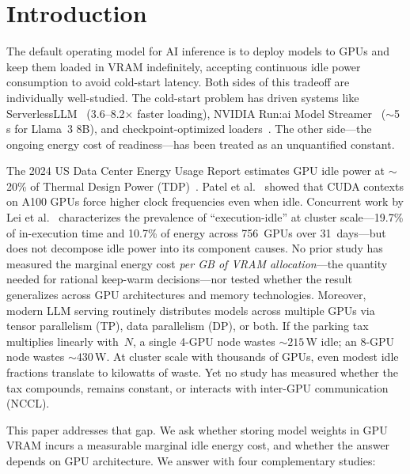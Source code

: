 \documentclass[sigconf,nonacm]{acmart}
\begin{document}
\section{Introduction}

The default operating model for AI inference is to deploy models to GPUs and keep them loaded in VRAM indefinitely, accepting continuous idle power consumption to avoid cold-start latency. Both sides of this tradeoff are individually well-studied. The cold-start problem has driven systems like ServerlessLLM~\cite{serverlessllm} (3.6--8.2$\times$ faster loading), NVIDIA Run:ai Model Streamer~\cite{nvidia-streamer} ($\sim$5\,s for Llama~3 8B), and checkpoint-optimized loaders~\cite{hydraserve,lambdascale}. The other side---the ongoing energy cost of readiness---has been treated as an unquantified constant.

The 2024 US Data Center Energy Usage Report estimates GPU idle power at $\sim$20\% of Thermal Design Power (TDP)~\cite{doe-report}. Patel et al.~\cite{patel-cal23} showed that CUDA contexts on A100 GPUs force higher clock frequencies even when idle. Concurrent work by Lei et al.~\cite{lei-idle} characterizes the prevalence of ``execution-idle'' at cluster scale---19.7\% of in-execution time and 10.7\% of energy across 756~GPUs over 31~days---but does not decompose idle power into its component causes. No prior study has measured the marginal energy cost \emph{per GB of VRAM allocation}---the quantity needed for rational keep-warm decisions---nor tested whether the result generalizes across GPU architectures and memory technologies. Moreover, modern LLM serving routinely distributes models across multiple GPUs via tensor parallelism (TP), data parallelism (DP), or both. If the parking tax multiplies linearly with~$N$, a single 4-GPU node wastes ${\sim}215$\,W idle; an 8-GPU node wastes ${\sim}430$\,W. At cluster scale with thousands of GPUs, even modest idle fractions translate to kilowatts of waste. Yet no study has measured whether the tax compounds, remains constant, or interacts with inter-GPU communication (NCCL).

This paper addresses that gap. We ask whether storing model weights in GPU VRAM incurs a measurable marginal idle energy cost, and whether the answer depends on GPU architecture. We answer with four complementary studies:
\end{document}
